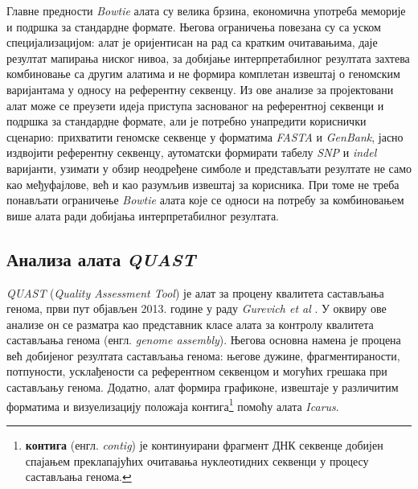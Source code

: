 \documentclass[12pt,oneside]{memoir}
\begin{document}
Главне предности \textit{Bowtie} алата су велика брзина, економична употреба меморије и подршка за стандардне формате. Његова ограничења повезана су са уском специјализацијом: алат је оријентисан на рад са кратким очитавањима, даје резултат мапирања ниског нивоа, за добијање интерпретабилног резултата захтева комбиновање са другим алатима и не формира комплетан извештај о геномским варијантама у односу на референтну секвенцу. Из ове анализе за пројектовани алат може се преузети идеја приступа заснованог на референтној секвенци и подршка за стандардне формате, али је потребно унапредити кориснички сценарио: прихватити геномске секвенце у форматима \textit{FASTA} и \textit{GenBank}, јасно издвојити референтну секвенцу, аутоматски формирати табелу \textit{SNP} и \textit{indel} варијанти, узимати у обзир неодређене симболе и представљати резултате не само као међуфајлове, већ и као разумљив извештај за корисника. При томе не треба понављати ограничење \textit{Bowtie} алата које се односи на потребу за комбиновањем више алата ради добијања интерпретабилног резултата.


\subsection{Анализа алата \textit{QUAST}}
\textit{QUAST} (\textit{Quality Assessment Tool}) је алат за процену квалитета састављања генома, први пут објављен 2013. године у раду \textit{Gurevich et al} \cite{gurevich2013quast}. У оквиру ове анализе он се разматра као представник класе алата за контролу квалитета састављања генома (енгл. \textit{genome assembly}). Његова основна намена је процена већ добијеног резултата састављања генома: његове дужине, фрагментираности, потпуности, усклађености са референтном секвенцом и могућих грешака при састављању генома. Додатно, алат формира графиконе, извештаје у различитим форматима и визуелизацију положаја контига\footnote{\textbf{контига} (енгл. \textit{contig}) је континуирани фрагмент ДНК секвенце добијен спајањем преклапајућих очитавања нуклеотидних секвенци у процесу састављања генома.} помоћу алата \textit{Icarus}.
\end{document}
